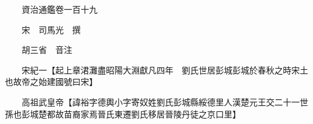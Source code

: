 










 


 
 


 

  
  
  
  
  





  
  
  
  
  
 
  

  

  
  
  



  

 
 

  
   




  

  
  


  　　資治通鑑卷一百十九

　　宋　司馬光　撰

　　胡三省　音注

　　宋紀一【起上章涒灘盡昭陽大淵獻凡四年　劉氏世居彭城彭城於春秋之時宋土也故帝之始建國號曰宋】

　　高祖武皇帝【諱裕字德輿小字寄奴姓劉氏彭城縣綏德里人漢楚元王交二十一世孫也彭城楚都故苗裔家焉晉氏東遷劉氏移居晉陵丹徒之京口里】


